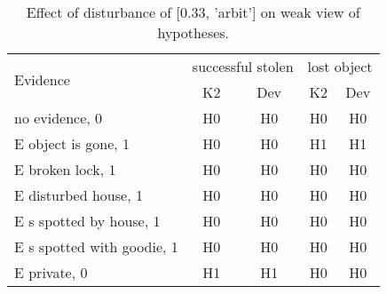 \begin{table}\begin{tabular}{l|cc|cc}\toprule\multirow{2}{*}{Evidence} & \multicolumn{2}{c}{successful stolen}& \multicolumn{2}{c}{lost object}\\& {K2} & {Dev}& {K2} & {Dev}\\\midrule
no evidence, 0 & H0&H0&H0&H0\\E object is gone, 1 & H0&H0&H1&H1\\E broken lock, 1 & H0&H0&H0&H0\\E disturbed house, 1 & H0&H0&H0&H0\\E s spotted by house, 1 & H0&H0&H0&H0\\E s spotted with goodie, 1 & H0&H0&H0&H0\\E private, 0 & H1&H1&H0&H0\\\bottomrule\end{tabular}\caption{Effect of disturbance of [0.33, 'arbit'] on weak view of hypotheses.}\end{table}